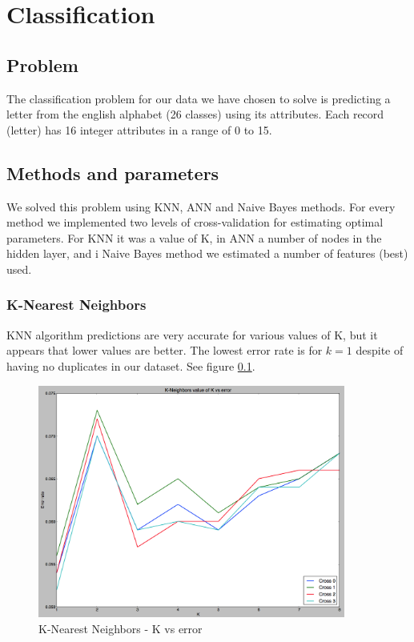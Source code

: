 \chapter*{Classification}
\section{Problem}
The classification problem for our data we have chosen to solve is predicting a letter
from the english alphabet (26 classes) using its attributes. Each record (letter) has 16 integer
attributes in a range of 0 to 15. 
\section{Methods and parameters}
We solved this problem using KNN, ANN and Naive Bayes methods. For every method we implemented
two levels of cross-validation for estimating optimal parameters. For KNN it was a value of K, in ANN a number
of nodes in the hidden layer, and i Naive Bayes method we estimated a number of features (best) used. 
\subsection{K-Nearest Neighbors}
KNN algorithm predictions are very accurate for various values of K, but it appears that lower values are better.
The lowest error rate is for $k=1$ despite of having no duplicates in our dataset. See figure \ref{fig:KN_kvalue}.
\begin{figure}[!tbh]
	\centering
	\includegraphics[width=0.9\textwidth]{figures/KN_kvalue}
	\caption{K-Nearest Neighbors - K vs error}
	\label{fig:KN_kvalue}
\end{figure}
